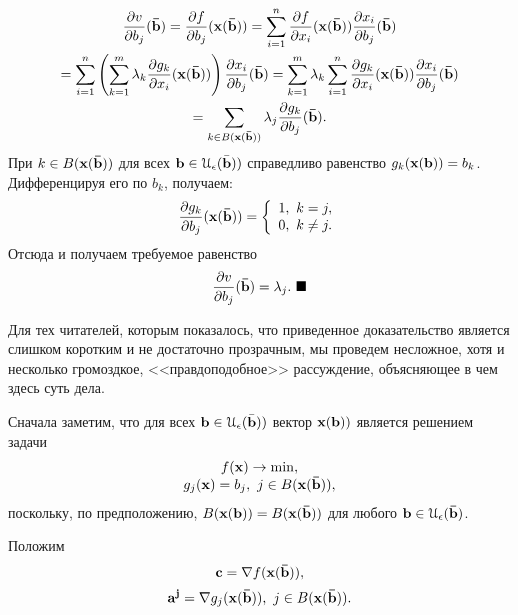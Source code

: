 \begin{multline*}
    \frac{\partial v}{\partial b_{j}}(\mathbf{\bar{b}})
    =\frac{\partial f}{\partial b_{j}}(\mathbf{x}(\mathbf{\bar{b}}))
    =\sum_{i=1}^{n}\frac{\partial f}{\partial x_{i}}(\mathbf{x}(\mathbf{\bar{b}}))
    \frac{\partial x_{i}}{\partial b_{j}}(\mathbf{\bar{b}}) \\
    =\sum_{i=1}^{n}\left(\sum_{k=1}^{m}\lambda_{k}
    \frac{\partial g_{k}}{\partial x_{i}}(\mathbf{x}(\mathbf{\bar{b}}))\right)
    \frac{\partial x_{i}}{\partial b_{j}}(\mathbf{\bar{b}})
    =\sum_{k=1}^{m}\lambda_{k}\sum_{i=1}^{n}
    \frac{\partial g_{k}}{\partial x_{i}}(\mathbf{x}(\mathbf{\bar{b}}))
    \frac{\partial x_{i}}{\partial b_{j}}(\mathbf{\bar{b}}) \\
    =\sum_{k\in B(\mathbf{x}(\mathbf{\bar{b}}))}
    \lambda_{j}\frac{\partial g_{k}}{\partial b_{j}}(\mathbf{\bar{b}}).
\end{multline*}
    При $k\in B(\mathbf{x}(\mathbf{\bar{b}}))$ для всех
    $\mathbf{b}\in\mathcal{U_{\epsilon}(\mathbf{\bar{b}}))}$
    справедливо равенство $g_{k}(\mathbf{x}(\mathbf{b}))=b_{k}$.
    Дифференцируя его по $b_{k}$, получаем:
\[\frac{\partial g_{k}}{\partial b_{j}}(\mathbf{x}(\mathbf{\bar{b}}))=
\left\{
\begin{array}{c}
        1, \ k=j, \\
        0, \ k\neq j.
      \end{array}
\right.
\]
    Отсюда и получаем требуемое равенство
    \[\frac{\partial v}{\partial b_{j}}(\mathbf{\bar{b}})=\lambda_{j}. \ \blacksquare\]


    Для тех читателей, которым показалось, что приведенное доказательство
    является слишком коротким и не достаточно прозрачным,
    мы проведем несложное, хотя и несколько громоздкое,
    <<правдоподобное>> рассуждение, объясняющее в
    чем здесь суть дела.

    Сначала заметим, что для всех
    $\mathbf{b}\in\mathcal{U_{\epsilon}(\mathbf{\bar{b}}))}$ вектор
    $\mathbf{x(\mathbf{b})})$ является решением задачи
\begin{equation}
    \label{zad-np-activ}
\begin{array}{c}
  f(\mathbf{x})\rightarrow\min, \\
  g_{j}(\mathbf{x})=b_{j}, \ j\in B(\mathbf{x}(\mathbf{\bar{b}})), \\
\end{array}
\end{equation}
    поскольку, по предположению,
    $B(\mathbf{x(\mathbf{b})})=B(\mathbf{x(\mathbf{\bar{b}})})$
    для любого $\mathbf{b}\in\mathcal{{U}}_{\epsilon}(\mathbf{\bar{b}})$.

    Положим
    \[\mathbf{c}=\nabla f(\mathbf{x}(\mathbf{\bar{b}})),\]
    \[\vc{a^{j}}=\nabla g_{j}(\vc{x}(\vc{\bar{b}})), \ j\in B(\vc{x}(\vc{\bar{b}})).\]



